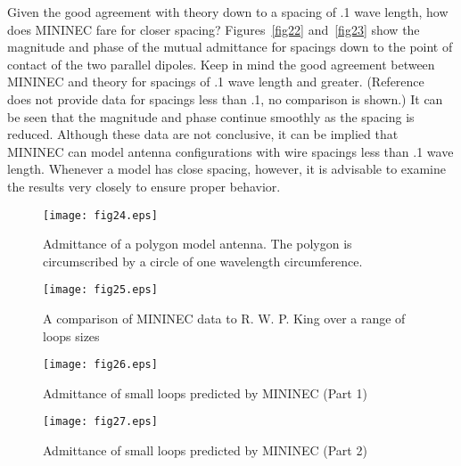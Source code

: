 \documentclass[12pt]{article}
\begin{document}
Given the good agreement with theory down to a spacing of .1 wave
length, how does MININEC fare for closer spacing? Figures~\ref{fig22}
and~\ref{fig23} show the magnitude and phase of the mutual admittance
for spacings down to the point of contact of the two parallel dipoles.
Keep in mind the good agreement between MININEC and theory for spacings
of .1 wave length and greater. (Reference~\cite{r9} does not provide
data for spacings less than .1, no comparison is shown.) It can be seen
that the magnitude and phase continue smoothly as the spacing is
reduced. Although these data are not conclusive, it can be implied that
MININEC can model antenna configurations with wire spacings less than .1
wave length. Whenever a model has close spacing, however, it is
advisable to examine the results very closely to ensure proper behavior.

\begin{sidewaysfigure}[htb]
\centerline{\texttt{[image: fig24.eps]}}
\caption{Admittance of a polygon model antenna. The polygon is
circumscribed by a circle of one wavelength circumference.}
\label{fig24}
\end{sidewaysfigure}

\begin{sidewaysfigure}[htb]
\centerline{\texttt{[image: fig25.eps]}}
\caption{A comparison of MININEC data to R. W. P. King over a range of
loops sizes}
\label{fig25}
\end{sidewaysfigure}

\begin{sidewaysfigure}[htb]
\centerline{\texttt{[image: fig26.eps]}}
\caption{Admittance of small loops predicted by MININEC (Part 1)}
\label{fig26}
\end{sidewaysfigure}

\begin{sidewaysfigure}[htb]
\centerline{\texttt{[image: fig27.eps]}}
\caption{Admittance of small loops predicted by MININEC (Part 2)}
\label{fig27}
\end{sidewaysfigure}
\afterpage\clearpage
\end{document}
